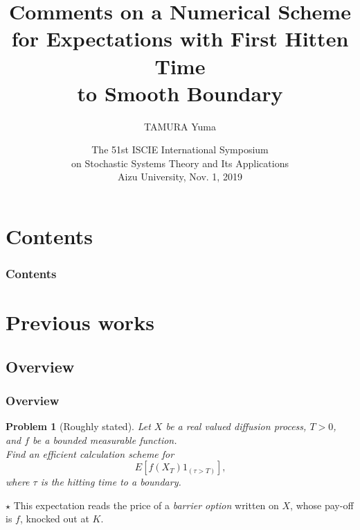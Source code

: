 \documentclass[dvipdfmx,11pt]{beamer}		%
\title{Comments on a Numerical Scheme\\for Expectations with First Hitten Time\\to Smooth Boundary}
\author{TAMURA Yuma}
\institute{Ritsumeikan Univ.}
\date{The 51st ISCIE International Symposium\\on Stochastic Systems Theory and Its Applications\\Aizu University, Nov. 1, 2019}
\newtheorem{prob}[defi]{Problem}
\begin{document}
%
\begin{frame}\frametitle{}
	\titlepage	
\end{frame}
%
\section*{Contents}
\begin{frame}\frametitle{Contents}
	\tableofcontents
\end{frame}
%
\section{Previous works}
\subsection{Overview}
%
\begin{frame}\frametitle{Overview}
	\begin{prob}[Roughly stated]
		Let \( X \) be a real valued diffusion process, \(T>0\), and \( f \) be a bounded measurable function.\\
		Find an efficient calculation scheme for
		\[
			E[ f(X_T)1_{(\tau>T)} ]	\text{,}
		\]
		where \( \tau \) is the hitting time to a boundary.
	\end{prob}
	\( \star \) This expectation reads the price of a \emph{barrier option} written on \( X \), whose pay-off is \( f \), knocked out at \( K \).
\end{frame}
%
\end{document}
